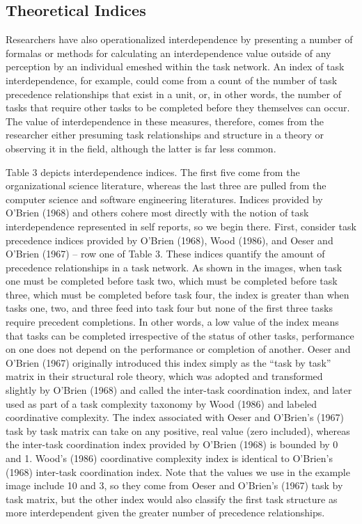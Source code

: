 \documentclass[english,,man]{apa6}
\theoremstyle{definition}
\theoremstyle{definition}
\theoremstyle{definition}
\theoremstyle{remark}
\begin{document}
\hypertarget{theoretical-indices}{%
\subsection{Theoretical Indices}\label{theoretical-indices}}

Researchers have also operationalized interdependence by presenting a
number of formalas or methods for calculating an interdependence value
outside of any perception by an individual emeshed within the task
network. An index of task interdependence, for example, could come from
a count of the number of task precedence relationships that exist in a
unit, or, in other words, the number of tasks that require other tasks
to be completed before they themselves can occur. The value of
interdependence in these measures, therefore, comes from the researcher
either presuming task relationships and structure in a theory or
observing it in the field, although the latter is far less common.

Table 3 depicts interdependence indices. The first five come from the
organizational science literature, whereas the last three are pulled
from the computer science and software engineering literatures. Indices
provided by O'Brien (1968) and others cohere most directly with the
notion of task interdependence represented in self reports, so we begin
there. First, consider task precedence indices provided by O'Brien
(1968), Wood (1986), and Oeser and O'Brien (1967) -- row one of Table 3.
These indices quantify the amount of precedence relationships in a task
network. As shown in the images, when task one must be completed before
task two, which must be completed before task three, which must be
completed before task four, the index is greater than when tasks one,
two, and three feed into task four but none of the first three tasks
require precedent completions. In other words, a low value of the index
means that tasks can be completed irrespective of the status of other
tasks, performance on one does not depend on the performance or
completion of another. Oeser and O'Brien (1967) originally introduced
this index simply as the \enquote{task by task} matrix in their
structural role theory, which was adopted and transformed slightly by
O'Brien (1968) and called the inter-task coordination index, and later
used as part of a task complexity taxonomy by Wood (1986) and labeled
coordinative complexity. The index associated with Oeser and O'Brien's
(1967) task by task matrix can take on any positive, real value (zero
included), whereas the inter-task coordination index provided by O'Brien
(1968) is bounded by 0 and 1. Wood's (1986) coordinative complexity
index is identical to O'Brien's (1968) inter-task coordination index.
Note that the values we use in the example image include 10 and 3, so
they come from Oeser and O'Brien's (1967) task by task matrix, but the
other index would also classify the first task structure as more
interdependent given the greater number of precedence relationships.
\end{document}

